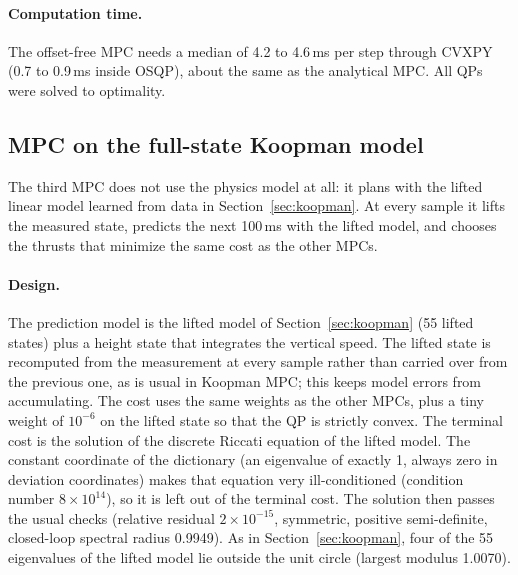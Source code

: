 \paragraph{Computation time.} The offset-free MPC needs a median of 4.2 to 4.6\,ms per step through CVXPY (0.7 to 0.9\,ms inside OSQP), about the same as the analytical MPC. All QPs were solved to optimality.

\subsection{MPC on the full-state Koopman model}\label{sec:fullkoopmanmpc}
\begin{plain}
The third MPC does not use the physics model at all: it plans with the lifted linear model learned from data in Section~\ref{sec:koopman}. At every sample it lifts the measured state, predicts the next 100\,ms with the lifted model, and chooses the thrusts that minimize the same cost as the other MPCs.
\end{plain}
\paragraph{Design.} The prediction model is the lifted model of Section~\ref{sec:koopman} (55 lifted states) plus a height state that integrates the vertical speed. The lifted state is recomputed from the measurement at every sample rather than carried over from the previous one, as is usual in Koopman MPC; this keeps model errors from accumulating. The cost uses the same weights as the other MPCs, plus a tiny weight of $10^{-6}$ on the lifted state so that the QP is strictly convex. The terminal cost is the solution of the discrete Riccati equation of the lifted model. The constant coordinate of the dictionary (an eigenvalue of exactly 1, always zero in deviation coordinates) makes that equation very ill-conditioned (condition number $8\times10^{14}$), so it is left out of the terminal cost. The solution then passes the usual checks (relative residual $2\times10^{-15}$, symmetric, positive semi-definite, closed-loop spectral radius 0.9949). As in Section~\ref{sec:koopman}, four of the 55 eigenvalues of the lifted model lie outside the unit circle (largest modulus 1.0070).

